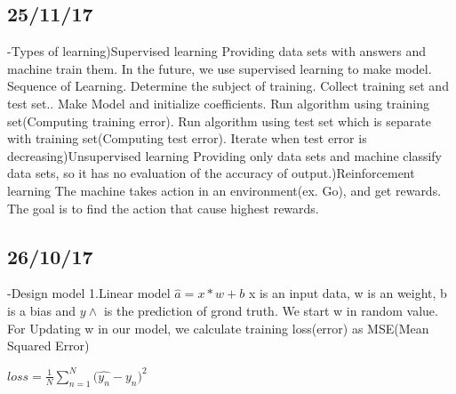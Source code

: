 \documentclass{article}
\begin{document}
\begin{CJK}{UTF8}{}
\subsection{25/11/17}
-Types of learning)Supervised learning\newline
Providing data sets with answers and machine train them. In the future, we use supervised learning to make model.\newline
Sequence of Learning. Determine the subject of training. Collect training set and test set.. Make Model and initialize coefficients. Run algorithm using training set(Computing training error). Run algorithm using test set which is separate with training set(Computing test error). Iterate when test error is decreasing)Unsupervised learning\newline
Providing only data sets and machine classify data sets, so it has no evaluation of the accuracy of output.)Reinforcement learning\newline
The machine takes action in an environment(ex. Go), and get rewards. The goal is to find the action that cause highest rewards.\newline


\subsection{26/10/17}
-Design model\newline
1.Linear model\newline
$
\hat{a} = x * w + b
$\newline
x is an input data, w is an weight, b is a bias and $y\wedge$ is the prediction of grond truth.
We start w in random value.\newline
For Updating w in our model, we calculate training loss(error) as MSE(Mean Squared Error)\newline
\begin{center}
$loss = \frac1N{\textstyle\sum_{n=1}^N}{\textstyle(}{\textstyle\hat{y_n}}{\textstyle-}{\textstyle{\scriptstyle y}_n}{\textstyle{\scriptstyle)}^2}$
 \end{center}\newline
 

\end{CJK}
\end{document}
